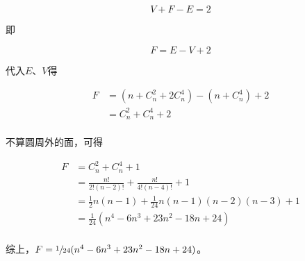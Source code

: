 \[ V + F - E = 2 \]

即

\[ F = E - V + 2 \]

代入$E$、$V$得

\begin{align*}
  F &= (n + C_n^2 + 2C_n^4) - (n + C_n^4) + 2 \\
  &= C_n^2 + C_n^4 + 2 \\
\end{align*}

不算圆周外的面，可得

\begin{align*}
  F &= C_n^2 + C_n^4 + 1 \\
  &= \frac{n!}{2!(n - 2)!} + \frac{n!}{4!(n - 4)!} + 1 \\
  &= \frac12n(n - 1) + \frac1{24}n(n - 1)(n - 2)(n - 3) + 1 \\
  &= \frac1{24}(n^4 - 6n^3 + 23n^2 - 18n + 24) \\
\end{align*}

综上，$F = \sfrac1{24}(n^4 - 6n^3 + 23n^2 - 18n + 24)$。
